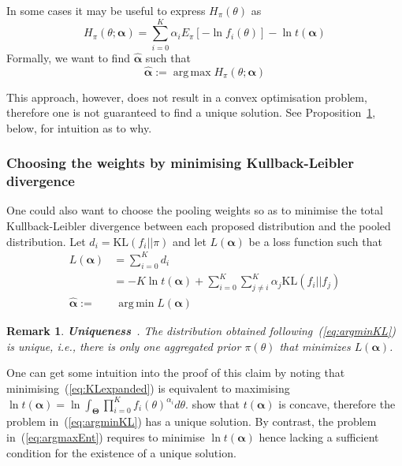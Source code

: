 \documentclass[a4paper, notitlepage, 10pt]{article}
\DeclareMathOperator*{\argmin}{arg\,min}
\DeclareMathOperator*{\argmax}{arg\,max}
\newtheorem{remark}{Remark}[]
\begin{document}
In some cases it may be useful to express $H_{\pi}(\theta)$ as
\begin{equation}
\label{eq:entropypiB}
 H_{\pi}(\theta; \boldsymbol\alpha) = \sum_{i=0}^{K} \alpha_i E_{\pi}[ - \ln f_i(\theta)] - \ln t(\boldsymbol\alpha)
\end{equation}
Formally, we want to find $\hat{\boldsymbol\alpha}$ such that
\begin{equation}
\label{eq:argmaxEnt}
 \hat{\boldsymbol\alpha}:= \argmax H_{\pi}(\theta; \boldsymbol\alpha)  
\end{equation}

This approach, however, does not result in a convex optimisation problem, therefore one is not guaranteed to find a unique solution. 
See Proposition~\ref{remark:uniqueness}, below, for intuition as to why.

\subsubsection*{Choosing the weights by minimising Kullback-Leibler divergence}

One could also want to choose the pooling weights so as to minimise the total Kullback-Leibler divergence between each proposed distribution and the pooled distribution.
Let $d_i = \text{KL}(f_i || \pi)$ and let $L(\boldsymbol\alpha)$ be a loss function such that
\begin{align}
L(\boldsymbol\alpha) &= \sum_{i=0}^Kd_i \\
\label{eq:KLexpanded}
     &= -K\ln t(\boldsymbol\alpha) + \sum_{i=0}^K\sum_{j\neq i}^K\alpha_j\text{KL}(f_i||f_j) \\
     \label{eq:argminKL}
     \hat{\boldsymbol\alpha}:=& \:\argmin L(\boldsymbol\alpha)   
\end{align}

\begin{remark}
\label{remark:uniqueness}
\textbf{Uniqueness}~\citep{rufo2012A}.
 The distribution obtained following~(\ref{eq:argminKL}) is unique, i.e., there is only one aggregated prior $\pi(\theta)$ that minimizes $L(\boldsymbol\alpha)$.
\end{remark}
One can get some intuition into the proof  of this claim by noting that minimising~(\ref{eq:KLexpanded}) is equivalent to maximising $\ln t(\boldsymbol\alpha) = \ln\int_{\boldsymbol\Theta}\prod_{i=0}^{K}f_i(\theta)^{\alpha_i}d\theta$. 
\cite{rufo2012A} show that $t(\boldsymbol\alpha)$ is concave, therefore the problem in~(\ref{eq:argminKL}) has a unique solution.
By contrast, the problem in~(\ref{eq:argmaxEnt}) requires to minimise $\ln t(\boldsymbol\alpha)$ hence lacking a sufficient condition for the existence of a unique solution.
\end{document}
